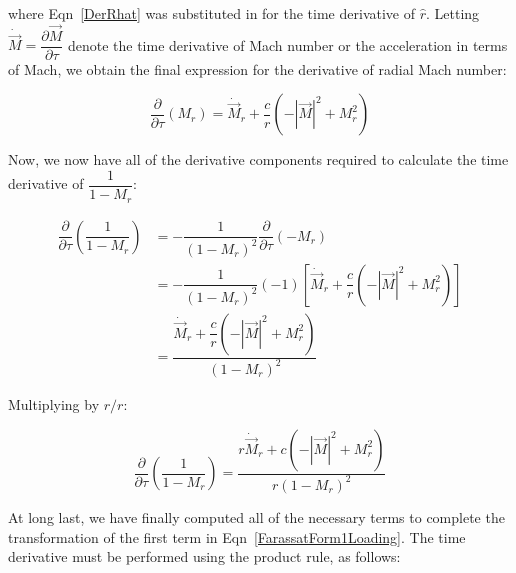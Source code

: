 \documentclass[]{aiaa-tc}%
\begin{document}
\noindent where Eqn~\ref{DerRhat} was substituted in for the time derivative of $\hat{r}$.  Letting $\dot{\vec{M}} = \dfrac{\partial \vec{M}}{\partial \tau}$ denote the time derivative of Mach number or the acceleration in terms of Mach, we obtain the final expression for the derivative of radial Mach number:

\begin{equation} \label{DerMr}
\dfrac{\partial}{\partial\tau} \left( M_r \right)
= \dot{\vec{M}}_r + \dfrac{c}{r}
    \left( -|\vec{M}|^2 + M_r^2 \right)
\end{equation}

Now, we now have all of the derivative components required to calculate the time derivative of $\dfrac{1}{1 - M_r}$:

\begin{align*}
\dfrac{\partial}{\partial\tau} \left( \dfrac{1}{1 - M_r} \right)
&= -\dfrac{1}{(1 - M_r)^2} \dfrac{\partial}{\partial\tau}(-M_r) \\
&= -\dfrac{1}{(1 - M_r)^2}(-1) \left[
    \dot{\vec{M}}_r +\dfrac{c}{r}\left( -|\vec{M}|^2 + M_r^2 \right) \right] \\
&= \dfrac{ \dot{\vec{M}}_r + \dfrac{c}{r} \left( -|\vec{M}|^2 + M_r^2 \right) }
    {(1 - M_r)^2}
\end{align*}

\noindent Multiplying by $r/r$:

\begin{equation} \label{DerMrDenom}
\dfrac{\partial}{\partial\tau} \left( \dfrac{1}{1 - M_r} \right)
= \dfrac{ r\dot{\vec{M}}_r + c \left( -|\vec{M}|^2 + M_r^2 \right) }
    {r (1 - M_r)^2}
\end{equation}

At long last, we have finally computed all of the necessary terms to complete the transformation of the first term in Eqn~\ref{FarassatForm1Loading}.  The time derivative must be performed using the product rule, as follows:
\end{document}
